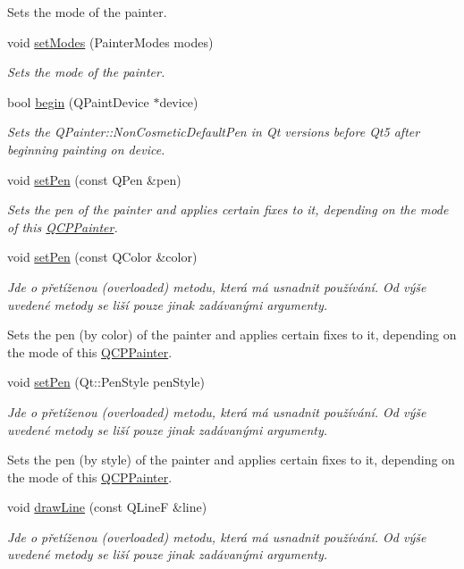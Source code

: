 \begin{DoxyCompactItemize}
\begin{DoxyCompactList}
Sets the mode of the painter. \end{DoxyCompactList}\item 
void \hyperlink{classQCPPainter_a5fac93adc29c7c4dea9f3e171e9e635e}{set\+Modes} (Painter\+Modes modes)
\begin{DoxyCompactList}\small\item\em Sets the mode of the painter. \end{DoxyCompactList}\item 
bool \hyperlink{classQCPPainter_a0a41146ccd619dceab6e25ec7b46b044}{begin} (Q\+Paint\+Device $\ast$device)
\begin{DoxyCompactList}\small\item\em Sets the Q\+Painter\+::\+Non\+Cosmetic\+Default\+Pen in Qt versions before Qt5 after beginning painting on {\itshape device}. \end{DoxyCompactList}\item 
void \hyperlink{classQCPPainter_af9c7a4cd1791403901f8c5b82a150195}{set\+Pen} (const Q\+Pen \&pen)
\begin{DoxyCompactList}\small\item\em Sets the pen of the painter and applies certain fixes to it, depending on the mode of this \hyperlink{classQCPPainter}{Q\+C\+P\+Painter}. \end{DoxyCompactList}\item 
void \hyperlink{classQCPPainter_a5c4d88f21564e156e88ef807f7cf0003}{set\+Pen} (const Q\+Color \&color)
\begin{DoxyCompactList}\small\item\em Jde o přetíženou (overloaded) metodu, která má usnadnit používání. Od výše uvedené metody se liší pouze jinak zadávanými argumenty.

Sets the pen (by color) of the painter and applies certain fixes to it, depending on the mode of this \hyperlink{classQCPPainter}{Q\+C\+P\+Painter}. \end{DoxyCompactList}\item 
void \hyperlink{classQCPPainter_a25e76095aae41da0d08035060e5f81ca}{set\+Pen} (Qt\+::\+Pen\+Style pen\+Style)
\begin{DoxyCompactList}\small\item\em Jde o přetíženou (overloaded) metodu, která má usnadnit používání. Od výše uvedené metody se liší pouze jinak zadávanými argumenty.

Sets the pen (by style) of the painter and applies certain fixes to it, depending on the mode of this \hyperlink{classQCPPainter}{Q\+C\+P\+Painter}. \end{DoxyCompactList}\item 
void \hyperlink{classQCPPainter_a0b4b1b9bd495e182c731774dc800e6e0}{draw\+Line} (const Q\+Line\+F \&line)
\begin{DoxyCompactList}\small\item\em Jde o přetíženou (overloaded) metodu, která má usnadnit používání. Od výše uvedené metody se liší pouze jinak zadávanými argumenty.


\end{DoxyCompactList}
\end{DoxyCompactItemize}
